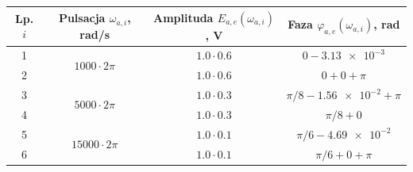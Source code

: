 \begin{table}[htb!]
\begin{center}
\begin{tabular}[c]{| c | c | c | c |} \hline
\textbf{Lp. $i$} & \textbf{Pulsacja $\omega_{a,i}$, rad/s} & \textbf{Amplituda $E_{a,e}(\omega_{a,i})$, V} & \textbf{Faza $\varphi_{a,e}(\omega_{a,i})$, rad} \\ \hline
1 & \multirow{2}{*}{$1000  \cdot 2\pi$} &  $1.0 \cdot 0.6$       & $0 - \num{3.13e-3}$            \\ \cline{1-1} \cline{3-4}
2 &                                     &  $1.0 \cdot 0.6$       & $0 + 0 + \pi$                  \\ \hline
3 & \multirow{2}{*}{$5000  \cdot 2\pi$} &  $1.0 \cdot 0.3$       & $\pi/8 - \num{1.56e-2} + \pi$  \\ \cline{1-1} \cline{3-4}
4 &                                     &  $1.0 \cdot 0.3$       & $\pi/8 + 0$                    \\ \hline
5 & \multirow{2}{*}{$15000 \cdot 2\pi$} &  $1.0 \cdot 0.1$       & $\pi/6 - \num{4.69e-2}$        \\ \cline{1-1} \cline{3-4}
6 &                                     &  $1.0 \cdot 0.1$       & $\pi/6 + 0 +\pi$               \\ \hline
\end{tabular}
\end{center}
\end{table}

